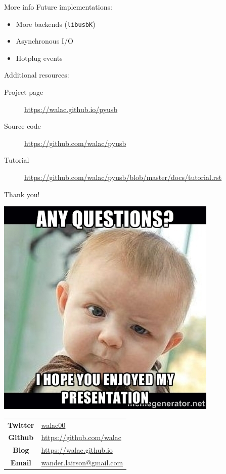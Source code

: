 \documentclass[pdf]{beamer}
\begin{document}
\begin{frame}{More info}
  Future implementations:
  \begin{itemize}
    \item More backends (\texttt{libusbK})
    \item Asynchronous I/O
    \item Hotplug events
  \end{itemize}

  Additional resources:
  \begin{description}
    \item[Project page] \url{https://walac.github.io/pyusb}
    \item[Source code] \url{https://github.com/walac/pyusb}
    \item[Tutorial] \url{https://github.com/walac/pyusb/blob/master/docs/tutorial.rst}
  \end{description}
\end{frame}

\begin{frame}{Thank you!}
  \begin{center}
    \includegraphics[scale=0.2]{img/questions.jpg}
  \end{center}

  \begin{center}
    \begin{tabular}{c l}
      \textbf{Twitter} & \href{https://twitter.com/walac00}{walac00} \\
      \textbf{Github} & \url{https://github.com/walac} \\
      \textbf{Blog} & \url{https://walac.github.io} \\
      \textbf{Email} & \href{mailto:wander.lairson@gmail.com}{wander.lairson@gmail.com} \\
    \end{tabular}
  \end{center}

\end{frame}
\end{document}
